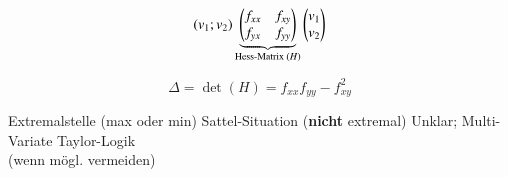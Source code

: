 \begingroup
\setlength{\arraycolsep}{1mm}
\begin{minipage}[t]{.35\columnwidth} %
    \[
        (v_1; v_2)
        \underbrace{\begin{pmatrix}
            f_{xx}                  &\tikznode{fxy}{$f_{xy}$}\\
            \tikznode{fyx}{$f_{yx}$}  &f_{yy}
        \end{pmatrix}}_{\text{Hess-Matrix ($H$)}}
        \begin{pmatrix}
            v_1\\
            v_2
        \end{pmatrix}
    \]
\end{minipage}\hfill
\begin{minipage}[t]{.55\columnwidth}
    \[
        \Delta = \det(H) = f_{xx}f_{yy} - f_{xy}^2
    \]
    \begin{outline}
        \1[$\Delta > 0$:] Extremalstelle (max oder min)
        \1[$\Delta < 0$:] Sattel-Situation (\textbf{nicht} extremal)
        \1[$\Delta = 0$:] Unklar; Multi-Variate Taylor-Logik\\
            (wenn mögl. vermeiden)
    \end{outline}
\end{minipage}
\endgroup

